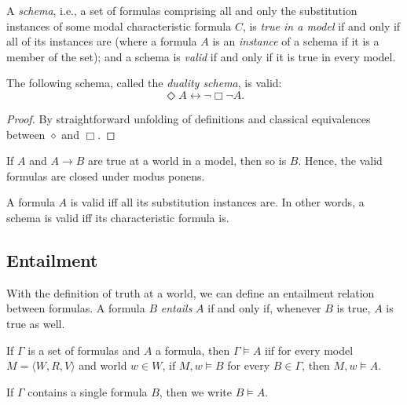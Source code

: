 \begin{definition}
  \label{valid-schema}
A \emph{schema}, i.e., a set of formulas comprising all and 
only the substitution instances of some modal characteristic formula $C$, 
is \emph{true in a model} if and only if all of its instances are 
(where a formula $A$ is an \emph{instance} of a schema if it is a 
member of the set); and a schema is \emph{valid} if and only if it is 
true in every model.
\end{definition}

\begin{proposition}
  \label{duality-schema}
  \leanok
The following schema, called the \emph{duality schema}, is valid:
\[
\Diamond A \leftrightarrow \neg \Box \neg A.
\]
\end{proposition}
\begin{proof}\label{proof:duality-schema}
  \leanok
  By straightforward unfolding of definitions and classical equivalences between \(\diamond\) and \(\Box\).
\end{proof}

\begin{proposition}
  \label{modus-ponens-validity}
  If $A$ and $A \rightarrow B$ are true at a world in a model,
  then so is $B$. Hence, the valid formulas are closed under modus ponens.
\end{proposition}

\begin{proposition}
  \label{substitution-validity}
  A formula $A$ is valid iff all its substitution instances are.
  In other words, a schema is valid iff its characteristic formula is.
\end{proposition}

\subsection{Entailment}
With the definition of truth at a world, we can define an entailment
relation between formulas. A formula $B$ \emph{entails} $A$ if and only if, whenever
$B$ is true, $A$ is true as well.

\begin{definition}
  \label{semantic-entailment}
  If $\Gamma$ is a set of formulas and $A$ a formula, then
  $\Gamma \vDash A$ iif
  for every model $M = \langle W, R, V \rangle$ and world $w \in W$,
  if $M, w \vDash B$ for every $B \in \Gamma$, then $M, w \vDash A$.

  If $\Gamma$ contains a single formula $B$, then we write $B \vDash A$.
\end{definition}


